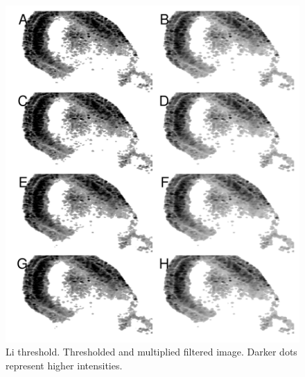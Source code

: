 \documentclass[10pt]{article}
\makeatletter
\def\maxwidth{ %
  \ifdim\Gin@nat@width>\linewidth
    \linewidth
  \else
    \Gin@nat@width
  \fi
}
\theoremstyle{plain}
\makeatother
\begin{document}
\begin{multicols*}{2}
\begin{Schunk}
\begin{figure}[H]
{\centering \includegraphics[width=\maxwidth]{figure/twocolumn-2_threshold_1-1} 

}

\caption[Li threshold]{Li threshold. Thresholded and multiplied filtered image. Darker dots represent higher intensities.}\label{fig:2_threshold_1}
\end{figure}
\end{Schunk}
\vfill
\newpage
\phantom{p}
\vspace*{\fill}
\begin{Schunk}
\begin{figure}[H]


\end{figure}
\end{Schunk}
\end{multicols*}
\end{document}
